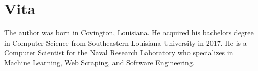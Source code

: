 \setcounter{secnumdepth}{0}
\section{Vita}
The author was born in Covington, Louisiana. He acquired his bachelors degree in Computer Science from Southeastern Louisiana University in 2017.
He is a Computer Scientist for the Naval Research Laboratory who specializes in Machine Learning, Web Scraping, and Software Engineering. 